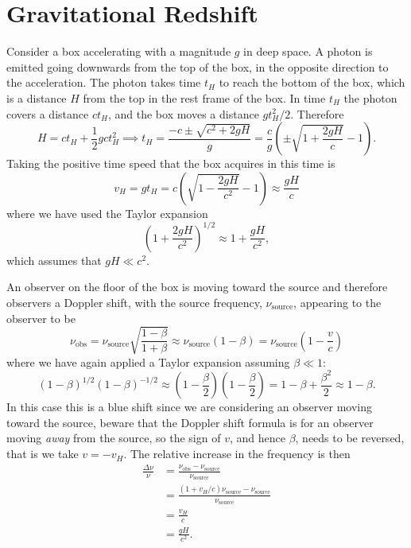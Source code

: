 \documentclass[fleqn]{NotesClass}
\begin{document}
    \section{Gravitational Redshift}
    Consider a box accelerating with a magnitude \(g\) in deep space.
    A photon is emitted going downwards from the top of the box, in the opposite direction to the acceleration.
    The photon takes time \(t_H\) to reach the bottom of the box, which is a distance \(H\) from the top in the rest frame of the box.
    In time \(t_H\) the photon covers a distance \(ct_H\), and the box moves a distance \(gt_H^2/2\). Therefore
    \begin{equation}
        H = ct_H + \frac{1}{2}gct_H^2 \implies t_H = \frac{-c \pm \sqrt{c^2 + 2gH}}{g} = \frac{c}{g}\left( \pm\sqrt{1 + \frac{2gH}{c}} - 1 \right).
    \end{equation}
    Taking the positive time speed that the box acquires in this time is
    \begin{equation}
        v_H = gt_H = c\left( \sqrt{1 - \frac{2gH}{c^2}} - 1 \right) \approx \frac{gH}{c}
    \end{equation}
    where we have used the Taylor expansion
    \begin{equation}
        \left( 1 + \frac{2gH}{c^2} \right)^{1/2} \approx 1 + \frac{gH}{c^2},
    \end{equation}
    which assumes that \(gH \ll c^2\).
    
    An observer on the floor of the box is moving toward the source and therefore observers a Doppler shift, with the source frequency, \(\nu_{\mathrm{source}}\), appearing to the observer to be
    \begin{equation}
        \nu_{\mathrm{obs}} = \nu_{\mathrm{source}}\sqrt{\frac{1 - \beta}{1 + \beta}} \approx \nu_{\mathrm{source}}(1 - \beta) = \nu_{\mathrm{source}}\left( 1 - \frac{v}{c} \right)
    \end{equation}
    where we have again applied a Taylor expansion assuming \(\beta \ll 1\):
    \begin{equation}
        (1 - \beta)^{1/2}(1 - \beta)^{-1/2} \approx \left( 1 - \frac{\beta}{2} \right)\left( 1 - \frac{\beta}{2} \right) = 1 - \beta + \frac{\beta^2}{2} \approx 1 - \beta.
    \end{equation}
    In this case this is a blue shift since we are considering an observer moving toward the source, beware that the Doppler shift formula is for an observer moving \emph{away} from the source, so the sign of \(v\), and hence \(\beta\), needs to be reversed, that is we take \(v = -v_H\).
    The relative increase in the frequency is then
    \begin{align}
        \frac{\Delta \nu}{\nu} &= \frac{\nu_{\mathrm{obs}} - \nu_{\mathrm{source}}}{\nu_{\mathrm{source}}}\\
        &= \frac{(1 + v_H/c)\nu_{\mathrm{source}} - \nu_{\mathrm{source}}}{\nu_{\mathrm{source}}}\\
        &= \frac{v_H}{c}\\
        &= \frac{gH}{c^2}.
    \end{align}
    
\end{document}
